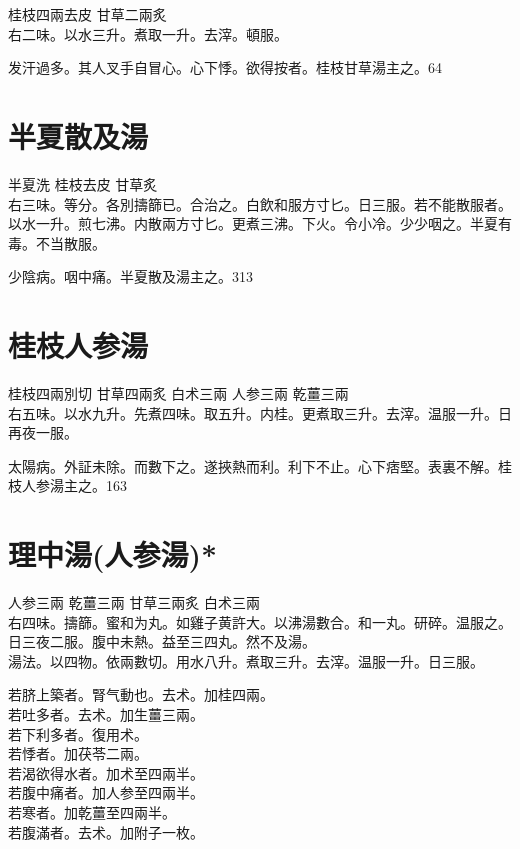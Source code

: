 桂枝{\scriptsize 四兩去皮} 甘草{\scriptsize 二兩炙}\\
右二味。以水三升。煮取一升。去滓。頓服。

发汗過多。其人叉手自冒心。心下悸。欲得按者。桂枝甘草湯主之。64

\section{半夏散及湯}

半夏{\scriptsize 洗} 桂枝{\scriptsize 去皮} 甘草{\scriptsize 炙}\\
右三味。等分。各別擣篩已。合治之。白飲和服方寸匕。日三服。若不能散服者。以水一升。煎七沸。内散兩方寸匕。更煮三沸。下火。令小冷。少少咽之。半夏有毒。不当散服。

少陰病。咽中痛。半夏散及湯主之。313

\section{桂枝人参湯}

桂枝{\scriptsize 四兩別切} 甘草{\scriptsize 四兩炙} 白术{\scriptsize 三兩} 人参{\scriptsize 三兩} 乾薑{\scriptsize 三兩}\\
右五味。以水九升。先煮四味。取五升。内桂。更煮取三升。去滓。温服一升。日再夜一服。

太陽病。外証未除。而數下之。遂挾熱而利。利下不止。心下痞堅。表裏不解。桂枝人参湯主之。163

\section{理中湯(人参湯)*}

人参{\scriptsize 三兩} 乾薑{\scriptsize 三兩} 甘草{\scriptsize 三兩炙} 白术{\scriptsize 三兩}\\
右四味。擣篩。蜜和为丸。如雞子黄許大。以沸湯數合。和一丸。研碎。温服之。日三夜二服。腹中未熱。益至三四丸。然不及湯。\\
湯法。以四物。依兩數切。用水八升。煮取三升。去滓。温服一升。日三服。

{\khaaitp 若}脐上築者。腎气動也。去术。加桂四兩。\\
{\khaaitp 若}吐多者。去术。加生薑三兩。\\
{\khaaitp 若}下{\khaaitp 利}多者。復用术。\\
{\khaaitp 若}悸者。加茯苓二兩。\\
{\khaaitp 若}渴{\khaaitp 欲得水}者。加术至四兩半。\\
{\khaaitp 若}腹中痛者。加人参至四兩半。\\
{\khaaitp 若}寒者。加乾薑至四兩半。\\
{\khaaitp 若}腹滿者。去术。加附子一枚。\\

